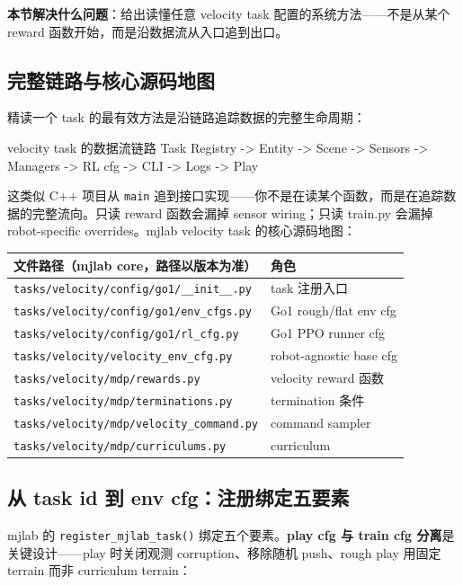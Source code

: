 \textbf{本节解决什么问题}：给出读懂任意 velocity task 配置的系统方法——不是从某个 reward 函数开始，而是沿数据流从入口追到出口。

\subsection{完整链路与核心源码地图}
\label{sec:rlmc-ql-readpath-map}

精读一个 task 的最有效方法是沿链路追踪数据的完整生命周期：

\begin{codebox}{velocity task 的数据流链路}
Task Registry -> Entity -> Scene -> Sensors -> Managers -> RL cfg -> CLI -> Logs -> Play
\end{codebox}

这类似 C++ 项目从 \verb|main| 追到接口实现——你不是在读某个函数，而是在追踪数据的完整流向。只读 reward 函数会漏掉 sensor wiring；只读 train.py 会漏掉 robot-specific overrides。mjlab velocity task 的核心源码地图：

\begin{center}
\small
\begin{tabular}{@{}ll@{}}
\toprule
文件路径（mjlab core，路径以版本为准） & 角色 \\
\midrule
\verb|tasks/velocity/config/go1/__init__.py| & task 注册入口 \\
\verb|tasks/velocity/config/go1/env_cfgs.py| & Go1 rough/flat env cfg \\
\verb|tasks/velocity/config/go1/rl_cfg.py| & Go1 PPO runner cfg \\
\verb|tasks/velocity/velocity_env_cfg.py| & robot-agnostic base cfg \\
\verb|tasks/velocity/mdp/rewards.py| & velocity reward 函数 \\
\verb|tasks/velocity/mdp/terminations.py| & termination 条件 \\
\verb|tasks/velocity/mdp/velocity_command.py| & command sampler \\
\verb|tasks/velocity/mdp/curriculums.py| & curriculum \\
\bottomrule
\end{tabular}
\end{center}

\subsection{从 task id 到 env cfg：注册绑定五要素}
\label{sec:rlmc-ql-readpath-reg}

mjlab 的 \verb|register_mjlab_task()| 绑定五个要素。\textbf{play cfg 与 train cfg 分离}是关键设计——play 时关闭观测 corruption、移除随机 push、rough play 用固定 terrain 而非 curriculum terrain：

